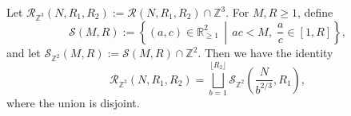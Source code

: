 \documentclass[table]{amsart}
\newcommand{\op}[1]{\operatorname{#1}}
\numberwithin{equation}{section}
\begin{document}
\noindent Let $\mathcal{R}_{\mathbb{Z}^3}(N, R_1, R_2) := \mathcal{R}(N, R_1, R_2) \cap \mathbb{Z}^3$. For $M, R \geq 1$, define
$$
\mathcal{S}(M, R) := \left\{ (a, c) \in \mathbb{R}_{\geq 1}^2 \,\middle|\, ac < M,\; \frac{a}{c} \in [1, R] \right\},
$$
\noindent and let $\mathcal{S}_{\mathbb{Z}^2}(M, R) := \mathcal{S}(M, R) \cap \mathbb{Z}^2$. Then we have the identity
\begin{equation}\label{mathcal R to mathcal S eqn}
\mathcal{R}_{\mathbb{Z}^3}(N, R_1, R_2) = \bigsqcup_{b=1}^{\lfloor R_2\rfloor} \mathcal{S}_{\mathbb{Z}^2}\left(\frac{N}{b^{2/3}}, R_1\right),
\end{equation}
where the union is disjoint.
\end{document}
